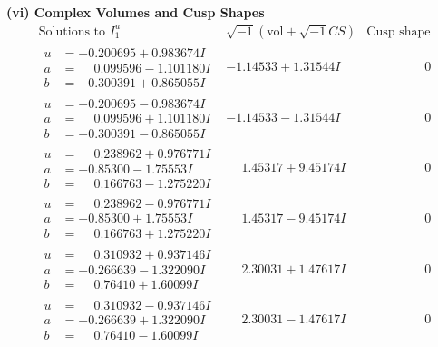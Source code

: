 \documentclass[1p]{elsarticle_modified}
\theoremstyle{definition}
\newcommand{\I}{\sqrt{-1}}
\begin{document}
\newpage\flushleft \textbf{(vi) Complex Volumes and Cusp Shapes}
$$\begin{array}{c|c|c}  
\text{Solutions to }I^u_{1}& \I (\text{vol} + \sqrt{-1}CS) & \text{Cusp shape}\\
 \hline 
\begin{aligned}
u &= -0.200695 + 0.983674 I \\
a &= \phantom{-}0.099596 - 1.101180 I \\
b &= -0.300391 + 0.865055 I\end{aligned}
 & -1.14533 + 1.31544 I & \phantom{-0.000000 } 0 \\ \hline\begin{aligned}
u &= -0.200695 - 0.983674 I \\
a &= \phantom{-}0.099596 + 1.101180 I \\
b &= -0.300391 - 0.865055 I\end{aligned}
 & -1.14533 - 1.31544 I & \phantom{-0.000000 } 0 \\ \hline\begin{aligned}
u &= \phantom{-}0.238962 + 0.976771 I \\
a &= -0.85300 - 1.75553 I \\
b &= \phantom{-}0.166763 - 1.275220 I\end{aligned}
 & \phantom{-}1.45317 + 9.45174 I & \phantom{-0.000000 } 0 \\ \hline\begin{aligned}
u &= \phantom{-}0.238962 - 0.976771 I \\
a &= -0.85300 + 1.75553 I \\
b &= \phantom{-}0.166763 + 1.275220 I\end{aligned}
 & \phantom{-}1.45317 - 9.45174 I & \phantom{-0.000000 } 0 \\ \hline\begin{aligned}
u &= \phantom{-}0.310932 + 0.937146 I \\
a &= -0.266639 - 1.322090 I \\
b &= \phantom{-}0.76410 + 1.60099 I\end{aligned}
 & \phantom{-}2.30031 + 1.47617 I & \phantom{-0.000000 } 0 \\ \hline\begin{aligned}
u &= \phantom{-}0.310932 - 0.937146 I \\
a &= -0.266639 + 1.322090 I \\
b &= \phantom{-}0.76410 - 1.60099 I\end{aligned}
 & \phantom{-}2.30031 - 1.47617 I & \phantom{-0.000000 } 0 \\ \hline\begin{aligned}

\end{aligned}
\end{array}$$
\end{document}
